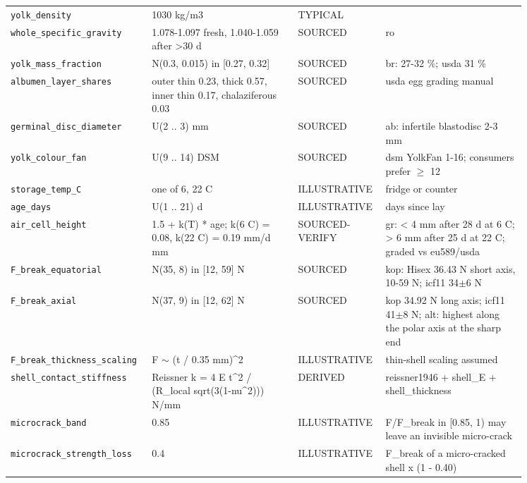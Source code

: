 \documentclass[10.5pt,a4paper]{article}
\begin{document}
{\begin{longtable}{@{}p{0.2\linewidth}p{0.27\linewidth}p{0.12\linewidth}p{0.26\linewidth}@{}}
\texttt{yolk\_\allowbreak{}density} & 1030 kg/m3 & TYPICAL &  \\
\texttt{whole\_\allowbreak{}specific\_\allowbreak{}gravity} & 1.078-1.097 fresh, 1.040-1.059 after >30 d & SOURCED & ro \\
\texttt{yolk\_\allowbreak{}mass\_\allowbreak{}fraction} & N(0.3, 0.015) in [0.27, 0.32] & SOURCED & br: 27-32 \%; usda 31 \% \\
\texttt{albumen\_\allowbreak{}layer\_\allowbreak{}shares} & outer thin 0.23, thick 0.57, inner thin 0.17, chalaziferous 0.03 & SOURCED & usda egg grading manual \\
\texttt{germinal\_\allowbreak{}disc\_\allowbreak{}diameter} & U(2 .. 3) mm & SOURCED & ab: infertile blastodisc 2-3 mm \\
\texttt{yolk\_\allowbreak{}colour\_\allowbreak{}fan} & U(9 .. 14) DSM & SOURCED & dsm YolkFan 1-16; consumers prefer $\ge$ 12 \\
\texttt{storage\_\allowbreak{}temp\_\allowbreak{}C} & one of 6, 22 C & ILLUSTRATIVE & fridge or counter \\
\texttt{age\_\allowbreak{}days} & U(1 .. 21) d & ILLUSTRATIVE & days since lay \\
\texttt{air\_\allowbreak{}cell\_\allowbreak{}height} & 1.5 + k(T) * age; k(6 C) = 0.08, k(22 C) = 0.19 mm/d mm & SOURCED-VERIFY & gr: < 4 mm after 28 d at 6 C; > 6 mm after 25 d at 22 C; graded vs eu589/usda \\
\texttt{F\_\allowbreak{}break\_\allowbreak{}equatorial} & N(35, 8) in [12, 59] N & SOURCED & kop: Hisex 36.43 N short axis, 10-59 N; icf11 34$\pm$6 N \\
\texttt{F\_\allowbreak{}break\_\allowbreak{}axial} & N(37, 9) in [12, 62] N & SOURCED & kop 34.92 N long axis; icf11 41$\pm$8 N; alt: highest along the polar axis at the sharp end \\
\texttt{F\_\allowbreak{}break\_\allowbreak{}thickness\_\allowbreak{}scaling} & F $\sim$ (t / 0.35 mm)\^{}2 & ILLUSTRATIVE & thin-shell scaling assumed \\
\texttt{shell\_\allowbreak{}contact\_\allowbreak{}stiffness} & Reissner k = 4 E t\^{}2 / (R\_local sqrt(3(1-nu\^{}2))) N/mm & DERIVED & reissner1946 + shell\_E + shell\_thickness \\
\texttt{microcrack\_\allowbreak{}band} & 0.85 & ILLUSTRATIVE & F/F\_break in [0.85, 1) may leave an invisible micro-crack \\
\texttt{microcrack\_\allowbreak{}strength\_\allowbreak{}loss} & 0.4 & ILLUSTRATIVE & F\_break of a micro-cracked shell x (1 - 0.40) \\

\end{longtable}}
\end{document}
